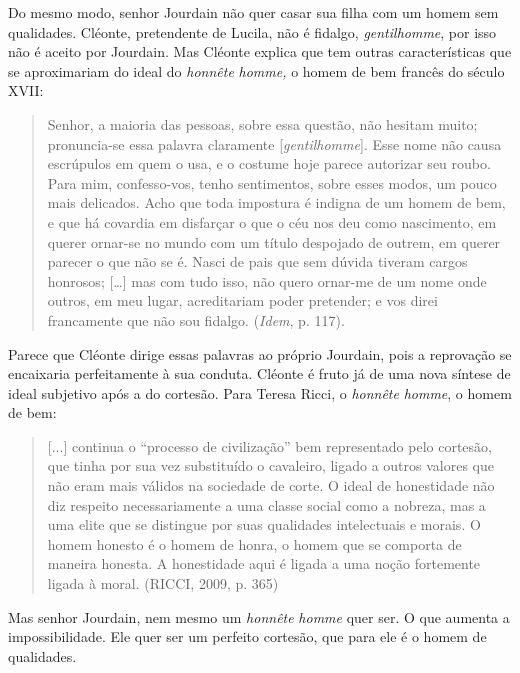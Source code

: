 Do mesmo modo, senhor Jourdain não quer casar sua filha com um homem sem
qualidades. Cléonte, pretendente de Lucila, não é fidalgo,
\emph{gentilhomme}, por isso não é aceito por Jourdain. Mas Cléonte
explica que tem outras características que se aproximariam do ideal do
\emph{honnête} \emph{homme,} o homem de bem francês do século XVII:

\begin{quote}
Senhor, a maioria das pessoas, sobre essa questão, não hesitam muito;
pronuncia-se essa palavra claramente {[}\emph{gentilhomme}{]}. Esse nome
não causa escrúpulos em quem o usa, e o costume hoje parece autorizar
seu roubo. Para mim, confesso-vos, tenho sentimentos, sobre esses modos,
um pouco mais delicados. Acho que toda impostura é indigna de um homem
de bem, e que há covardia em disfarçar o que o céu nos deu como
nascimento, em querer ornar-se no mundo com um título despojado de
outrem, em querer parecer o que não se é. Nasci de pais que sem dúvida
tiveram cargos honrosos; {[}\ldots{}{]} mas com tudo isso, não quero
ornar-me de um nome onde outros, em meu lugar, acreditariam poder
pretender; e vos direi francamente que não sou fidalgo. (\emph{Idem}, p.
117).
\end{quote}

Parece que Cléonte dirige essas palavras ao próprio Jourdain, pois a
reprovação se encaixaria perfeitamente à sua conduta. Cléonte é fruto já
de uma nova síntese de ideal subjetivo após a do cortesão. Para Teresa
Ricci, o \emph{honnête} \emph{homme}, o homem de bem:

\begin{quote}
{[}...{]} continua o ``processo de civilização'' bem representado pelo
cortesão, que tinha por sua vez substituído o cavaleiro, ligado a outros
valores que não eram mais válidos na sociedade de corte. O ideal de
honestidade não diz respeito necessariamente a uma classe social como a
nobreza, mas a uma elite que se distingue por suas qualidades
intelectuais e morais. O homem honesto é o homem de honra, o homem que
se comporta de maneira honesta. A honestidade aqui é ligada a uma noção
fortemente ligada à moral. (RICCI, 2009, p. 365)
\end{quote}

Mas senhor Jourdain, nem mesmo um \emph{honnête} \emph{homme} quer ser.
O que aumenta a impossibilidade. Ele quer ser um perfeito cortesão, que
para ele é o homem de qualidades.

